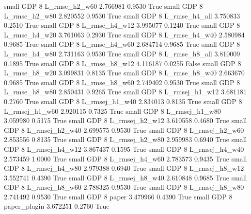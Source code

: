      small      GDP                 8  L_rmse_h2_w60   2.766981      0.9530    True
     small      GDP                 8  L_rmse_h2_w80   2.820552      0.9530    True
     small      GDP                 8  L_rmse_h4_all   3.750833      0.2510    True
     small      GDP                 8  L_rmse_h4_w12   3.995077      0.1240    True
     small      GDP                 8  L_rmse_h4_w20   3.761063      0.2930    True
     small      GDP                 8  L_rmse_h4_w40   2.580984      0.9685    True
     small      GDP                 8  L_rmse_h4_w60   2.684714      0.9685    True
     small      GDP                 8  L_rmse_h4_w80   2.731163      0.9530    True
     small      GDP                 8  L_rmse_h8_all   3.810009      0.1895    True
     small      GDP                 8  L_rmse_h8_w12   4.116187      0.0255   False
     small      GDP                 8  L_rmse_h8_w20   3.099831      0.8135    True
     small      GDP                 8  L_rmse_h8_w40   2.663670      0.9685    True
     small      GDP                 8  L_rmse_h8_w60   2.749402      0.9530    True
     small      GDP                 8  L_rmse_h8_w80   2.850431      0.9265    True
     small      GDP                 8 L_rmsej_h1_w12   3.681181      0.2760    True
     small      GDP                 8 L_rmsej_h1_w40   2.834013      0.8135    True
     small      GDP                 8 L_rmsej_h1_w60   2.920115      0.7325    True
     small      GDP                 8 L_rmsej_h1_w80   3.059980      0.5175    True
     small      GDP                 8 L_rmsej_h2_w12   3.610558      0.4680    True
     small      GDP                 8 L_rmsej_h2_w40   2.699575      0.9530    True
     small      GDP                 8 L_rmsej_h2_w60   2.853556      0.8135    True
     small      GDP                 8 L_rmsej_h2_w80   2.959983      0.6940    True
     small      GDP                 8 L_rmsej_h4_w12   3.867437      0.1595    True
     small      GDP                 8 L_rmsej_h4_w40   2.573459      1.0000    True
     small      GDP                 8 L_rmsej_h4_w60   2.783573      0.9435    True
     small      GDP                 8 L_rmsej_h4_w80   2.979388      0.6940    True
     small      GDP                 8 L_rmsej_h8_w12   3.552741      0.4390    True
     small      GDP                 8 L_rmsej_h8_w40   2.610848      0.9685    True
     small      GDP                 8 L_rmsej_h8_w60   2.788325      0.9530    True
     small      GDP                 8 L_rmsej_h8_w80   2.741492      0.9530    True
     small      GDP                 8          paper   3.479966      0.4390    True
     small      GDP                 8   paper_plugin   3.672251      0.2760    True